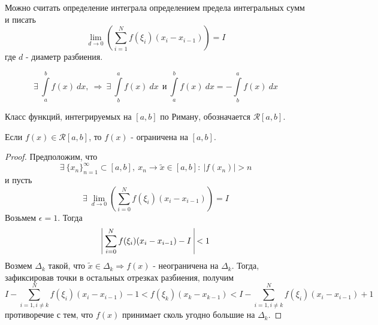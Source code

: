 \begin{comm}
    Можно считать определение интеграла определением предела интегральных сумм и писать
    \[\lim\limits_{d\to 0}\left(\sum\limits_{i=1}^{N}f(\xi_i)(x_i-x_{i-1})\right)=I\]
    где $d$ - диаметр разбиения.
\end{comm} 
\begin{statement}
    \[\exists\ \int\limits_{a}^{b}f(x)\ dx,\ \Rightarrow \ \exists\ \int\limits_{b}^{a}f(x)\ dx\ \ \text{и}\ \int\limits_{a}^{b}f(x)\ dx=-\int\limits_{b}^{a}f(x)\ dx\]
\end{statement} 
\begin{definition}
    Класс функций, интегрируемых на $[a,b]$ по Риману, обозначается $\mathcal{R}[a,b]$.
\end{definition} 
\begin{theorem}
    Если $f(x)\in \mathcal{R}[a,b]$, то $f(x)$ - ограничена на $[a,b]$.
\end{theorem} 
\begin{proof}
    Предположим, что 
    \[\exists\ \{x_n\}_{n=1}^{\infty}\subset [a,b],\ x_n\to\widetilde{x}\in [a,b]:\ |f(x_n)|>n\]
    и пусть
    \[\exists\ \lim\limits_{d\to 0}\left( \sum\limits_{i=0}^{N}f(\xi_i)(x_i-x_{i-1}) \right)=I\] 
    Возьмем $\epsilon=1$. Тогда  
    \[\vline\ \sum\limits_{i=0}^{N}f(\xi_i)(x_i-x_{i-1})-I\ \vline<1\]
    Возмем $\Delta_k$ такой, что $\widetilde{x}\in \Delta_k \Rightarrow f(x)$ - неограничена на $\Delta_k$. Тогда, зафиксировав точки в остальных отрезках разбиения, получим
    \[I-\sum\limits_{i=1,i\ne k}^{N} f(\xi_i)(x_i-x_{i-1})-1<f(\xi_k)(x_k-x_{k-1})<I-\sum\limits_{i=1,i\ne k}^{N} f(\xi_i)(x_i-x_{i-1})+1\]
    противоречие с тем, что $f(x)$ принимает сколь угодно большие  на $\Delta_k$.
\end{proof} 

